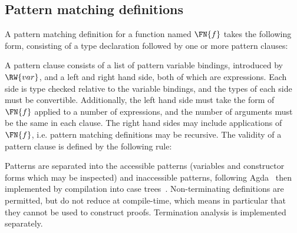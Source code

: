 \DM{
\AR{
\Data\hg\Vect\Hab\Nat\to(\va\Hab\Type)\to\Type\hg\Where \\
\hg\hg\ARd{
& \nil\Hab\Vect\;\Z\;\va\\
\mid & (\cons)\Hab\fbind{\vk}{\Nat}{
\fbind{\vx}{\va}{\fbind{\vxs}{\Vect\;\vk\;\va}{\Vect\;(\suc\;\vk)\;\va}}
}
}
}
}

\subsection{Pattern matching definitions}

\label{sect:patdefs}



A pattern matching definition for a function named $\FN{f}$ takes the following form,
consisting of a type declaration followed by one or more pattern clauses:


A pattern clause consists of a list of pattern variable bindings, introduced by
$\RW{var}$,
and a left and right hand side, both of which
are \TT{} expressions. Each side is type checked relative to the variable bindings,
and the types of each side must be convertible. Additionally, the
left hand side must take the form of $\FN{f}$ applied to a number of \TT{} expressions,
and the number of arguments must be the same in each clause. The right hand
sides may include applications of $\FN{f}$, i.e. pattern matching definitions may
be recursive. The validity of a pattern
clause is defined by the following rule:


Patterns are separated into the accessible patterns (variables and constructor
forms which may be inspected) and inaccessible patterns, following
Agda~\cite{norell2007thesis} then implemented by compilation into case
trees~\cite{Augustsson1985}. Non-terminating definitions are permitted, but do
not reduce at compile-time, which means in particular that they cannot be used
to construct proofs.
Termination analysis is implemented separately.

